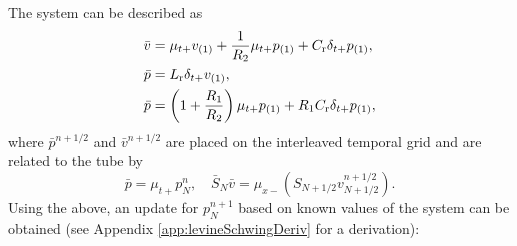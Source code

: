 {The system can be described as
\begin{subequations}\label{eq:barVPSystem}
    \begin{align}
        \bar v &= \mu_{t+}v_{(1)} + \frac{1}{R_2}\mu_{t+}p_{(1)} + C_{\text{r}} \delta_{t+}p_{(1)},\label{eq:barV}\\
        \bar p &= L_{\text{r}} \delta_{t+}v_{(1)},\label{eq:barP1}\\
        \bar p &= \left(1+\frac{R_1}{R_2}\right)\mu_{t+}p_{(1)}+ R_1 C_{\text{r}}\delta_{t+}p_{(1)}\label{eq:barP2},
    \end{align}
\end{subequations}
where $\bar p^{n+1/2}$ and $\bar v^{n+1/2}$ are placed on the interleaved temporal grid and are related to the tube by
\begin{equation}\label{eq:barVars}
    \bar p = \mu_{t+}p^n_N, \quad \bar S_N \bar v = \mu_{x-}\left(S_{N+1/2}v_{N+1/2}^{n+1/2}\right).
\end{equation}
Using the above, an update for $p^{n+1}_N$ based on known values of the system can be obtained (see Appendix \eqref{app:levineSchwingDeriv} for a derivation):

}
